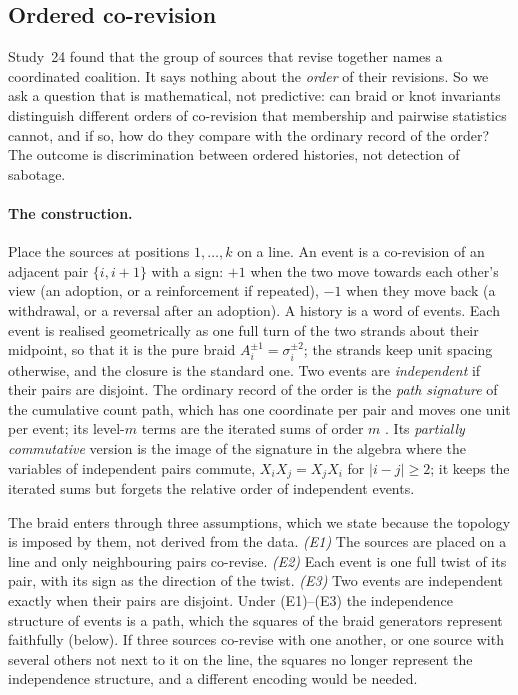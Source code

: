 \documentclass[11pt]{article}
\theoremstyle{definition}\newtheorem{definition}[theorem]{Definition}\newtheorem{remark}[theorem]{Remark}\newtheorem{example}[theorem]{Example}\newtheorem{problem}[theorem]{Open problem}\crefname{problem}{Problem}{Problems}
\begin{document}
\subsection{Ordered co-revision}\label{sec:ordrev}
Study~24 found that the group of sources that revise together names a coordinated coalition. It says nothing about the \emph{order} of their revisions. So we ask a question that is mathematical, not predictive: can braid or knot invariants distinguish different orders of co-revision that membership and pairwise statistics cannot, and if so, how do they compare with the ordinary record of the order? The outcome is discrimination between ordered histories, not detection of sabotage.

\paragraph{The construction.} Place the sources at positions $1,\dots,k$ on a line. An event is a co-revision of an adjacent pair $\{i,i+1\}$ with a sign: $+1$ when the two move towards each other's view (an adoption, or a reinforcement if repeated), $-1$ when they move back (a withdrawal, or a reversal after an adoption). A history is a word of events. Each event is realised geometrically as one full turn of the two strands about their midpoint, so that it is the pure braid $A_i^{\pm1}=\sigma_i^{\pm2}$; the strands keep unit spacing otherwise, and the closure is the standard one. Two events are \emph{independent} if their pairs are disjoint. The ordinary record of the order is the \emph{path signature} of the cumulative count path, which has one coordinate per pair and moves one unit per event; its level-$m$ terms are the iterated sums of order $m$ \cite{Chen1977}. Its \emph{partially commutative} version is the image of the signature in the algebra where the variables of independent pairs commute, $X_iX_j=X_jX_i$ for $|i-j|\ge2$; it keeps the iterated sums but forgets the relative order of independent events.

The braid enters through three assumptions, which we state because the topology is imposed by them, not derived from the data. \emph{(E1)} The sources are placed on a line and only neighbouring pairs co-revise. \emph{(E2)} Each event is one full twist of its pair, with its sign as the direction of the twist. \emph{(E3)} Two events are independent exactly when their pairs are disjoint. Under (E1)--(E3) the independence structure of events is a path, which the squares of the braid generators represent faithfully (below). If three sources co-revise with one another, or one source with several others not next to it on the line, the squares no longer represent the independence structure, and a different encoding would be needed.
\end{document}
